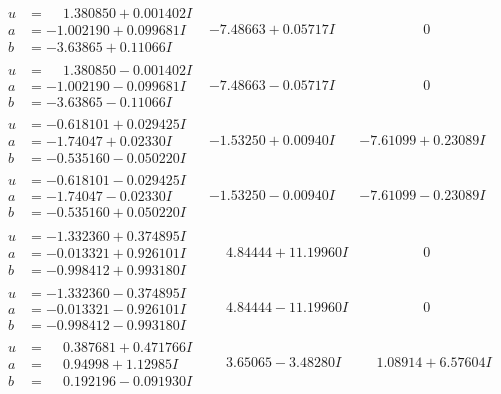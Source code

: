 \documentclass[1p]{elsarticle_modified}
\theoremstyle{definition}
\begin{document}
$$\begin{array}{c|c|c}
\begin{aligned}
u &= \phantom{-}1.380850 + 0.001402 I \\
a &= -1.002190 + 0.099681 I \\
b &= -3.63865 + 0.11066 I\end{aligned}
 & -7.48663 + 0.05717 I & \phantom{-0.000000 } 0 \\ \hline\begin{aligned}
u &= \phantom{-}1.380850 - 0.001402 I \\
a &= -1.002190 - 0.099681 I \\
b &= -3.63865 - 0.11066 I\end{aligned}
 & -7.48663 - 0.05717 I & \phantom{-0.000000 } 0 \\ \hline\begin{aligned}
u &= -0.618101 + 0.029425 I \\
a &= -1.74047 + 0.02330 I \\
b &= -0.535160 - 0.050220 I\end{aligned}
 & -1.53250 + 0.00940 I & -7.61099 + 0.23089 I \\ \hline\begin{aligned}
u &= -0.618101 - 0.029425 I \\
a &= -1.74047 - 0.02330 I \\
b &= -0.535160 + 0.050220 I\end{aligned}
 & -1.53250 - 0.00940 I & -7.61099 - 0.23089 I \\ \hline\begin{aligned}
u &= -1.332360 + 0.374895 I \\
a &= -0.013321 + 0.926101 I \\
b &= -0.998412 + 0.993180 I\end{aligned}
 & \phantom{-}4.84444 + 11.19960 I & \phantom{-0.000000 } 0 \\ \hline\begin{aligned}
u &= -1.332360 - 0.374895 I \\
a &= -0.013321 - 0.926101 I \\
b &= -0.998412 - 0.993180 I\end{aligned}
 & \phantom{-}4.84444 - 11.19960 I & \phantom{-0.000000 } 0 \\ \hline\begin{aligned}
u &= \phantom{-}0.387681 + 0.471766 I \\
a &= \phantom{-}0.94998 + 1.12985 I \\
b &= \phantom{-}0.192196 - 0.091930 I\end{aligned}
 & \phantom{-}3.65065 - 3.48280 I & \phantom{-}1.08914 + 6.57604 I \\ \hline\begin{aligned}

\end{aligned}
\end{array}$$
\end{document}
